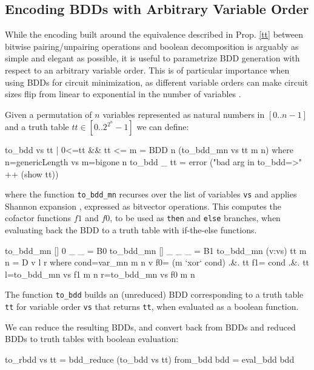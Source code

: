 \documentclass[]{INCLUDES/llncs}
\begin{document}
\subsection{Encoding BDDs with Arbitrary Variable Order}
While the encoding built around the equivalence described in Prop. \ref{tt}
between bitwise pairing/unpairing operations and boolean decomposition
is arguably as simple and elegant as possible, it is useful
to parametrize BDD generation with respect to an arbitrary
variable order. This is of particular importance when using
BDDs for circuit minimization, as different variable orders
can make circuit sizes flip from linear to exponential in
the number of variables \cite{bryant86graphbased}.

Given a permutation of $n$ variables represented as
natural numbers in $[0..n-1]$ and a truth table
$tt \in [0..2^{2^n}-1]$ we can define: 
\begin{code}
to_bdd vs tt | 0<=tt && tt <= m = 
  BDD n (to_bdd_mn vs tt m n) where
    n=genericLength vs
    m=bigone n
to_bdd _ tt = error 
   ("bad arg in to_bdd=>" ++ (show tt)) 
\end{code}
where the function {\tt to\_bdd\_mn} recurses over
the list of variables {\tt vs} and applies
Shannon expansion \cite{shannon_all},
expressed as bitvector operations. This computes the cofactor functions
$f1$ and $f0$, to be used as {\tt then} and {\tt else}
branches, when evaluating back the BDD to a truth table
with if-the-else functions.
\begin{code}
to_bdd_mn []      0 _ _ = B0
to_bdd_mn []      _ _ _ = B1
to_bdd_mn (v:vs) tt m n = D v l r where
  cond=var_mn m n v
  f0= (m `xor` cond) .&. tt
  f1= cond .&. tt 
  l=to_bdd_mn vs f1 m n
  r=to_bdd_mn vs f0 m n
\end{code}
\begin{prop}
The function {\tt to\_bdd} builds an (unreduced) BDD corresponding
to a truth table {\tt tt} for variable order {\tt vs} that returns
{\tt tt}, when evaluated as a boolean function.
\end{prop}
We can reduce the resulting BDDs, and convert back from BDDs and reduced BDDs to
truth tables with boolean evaluation: 
\begin{code}
to_rbdd vs tt = bdd_reduce (to_bdd vs tt)
from_bdd bdd = eval_bdd bdd
\end{code}
\end{document}
